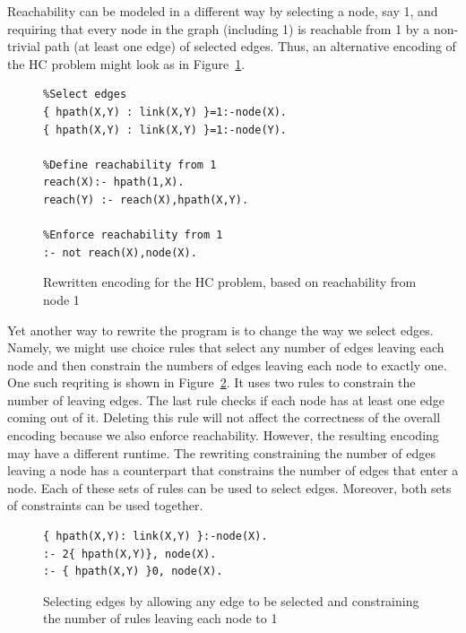 \documentclass{new_tlp}
\begin{document}
Reachability can be modeled in a different way by selecting a node, say 1, and
requiring that every node in the graph (including 1) is reachable from 1 by a 
non-trivial path (at least one edge) of selected edges. Thus, an alternative 
encoding of the HC problem might look as in Figure~\ref{reachencod2}.  

\begin{figure}
\figrule
\begin{center}
\begin{verbatim}
%Select edges
{ hpath(X,Y) : link(X,Y) }=1:-node(X).
{ hpath(X,Y) : link(X,Y) }=1:-node(Y).

%Define reachability from 1
reach(X):- hpath(1,X).
reach(Y) :- reach(X),hpath(X,Y).

%Enforce reachability from 1
:- not reach(X),node(X).
\end{verbatim}
\end{center}
\caption{Rewritten encoding for the HC problem, based on reachability from
node 1}\label{reachencod2}
\figrule
\end{figure}

Yet another way to rewrite the program is to change the way we select edges.
Namely, we might use choice rules that select any number of edges leaving each 
node and then constrain the numbers of edges leaving each node to exactly one.
One such reqriting is shown in Figure~\ref{breakrule}. It uses two rules to 
constrain the number of leaving edges. The last rule checks if each node has 
at least one edge coming out of it. Deleting this rule will not affect the 
correctness of the overall encoding because we also enforce reachability. 
However, the resulting encoding may have a different runtime. The rewriting 
constraining the number of edges leaving a node has a counterpart that 
constrains the number of edges that enter a node. Each of these sets of
rules can be used to select edges. Moreover, both sets of constraints can 
be used together. 

\begin{figure}
\figrule
\begin{center}
\begin{verbatim}
{ hpath(X,Y): link(X,Y) }:-node(X).
:- 2{ hpath(X,Y)}, node(X).
:- { hpath(X,Y) }0, node(X).
\end{verbatim}
\end{center}
\caption{Selecting edges by allowing any edge to be selected and constraining
the number of rules leaving each node  to 1}\label{breakrule}
\figrule
\end{figure}
\end{document}
